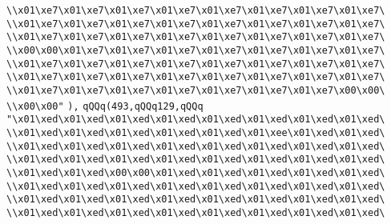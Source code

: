 \verb|\\x01\xe7\x01\xe7\x01\xe7\x01\xe7\x01\xe7\x01\xe7\x01\xe7\x01\xe7\|\newline
\verb|\\x01\xe7\x01\xe7\x01\xe7\x01\xe7\x01\xe7\x01\xe7\x01\xe7\x01\xe7\|\newline
\verb|\\x01\xe7\x01\xe7\x01\xe7\x01\xe7\x01\xe7\x01\xe7\x01\xe7\x01\xe7\|\newline
\verb|\\x00\x00\x01\xe7\x01\xe7\x01\xe7\x01\xe7\x01\xe7\x01\xe7\x01\xe7\|\newline
\verb|\\x01\xe7\x01\xe7\x01\xe7\x01\xe7\x01\xe7\x01\xe7\x01\xe7\x01\xe7\|\newline
\verb|\\x01\xe7\x01\xe7\x01\xe7\x01\xe7\x01\xe7\x01\xe7\x01\xe7\x01\xe7\|\newline
\verb|\\x01\xe7\x01\xe7\x01\xe7\x01\xe7\x01\xe7\x01\xe7\x01\xe7\x00\x00\|\newline
\verb|\\x00\x00"|\newline
\verb|),|\newline
\verb|qQQq(493,qQQq129,qQQq|\newline
\verb|"\x01\xed\x01\xed\x01\xed\x01\xed\x01\xed\x01\xed\x01\xed\x01\xed\|\newline
\verb|\\x01\xed\x01\xed\x01\xed\x01\xed\x01\xed\x01\xee\x01\xed\x01\xed\|\newline
\verb|\\x01\xed\x01\xed\x01\xed\x01\xed\x01\xed\x01\xed\x01\xed\x01\xed\|\newline
\verb|\\x01\xed\x01\xed\x01\xed\x01\xed\x01\xed\x01\xed\x01\xed\x01\xed\|\newline
\verb|\\x01\xed\x01\xed\x00\x00\x01\xed\x01\xed\x01\xed\x01\xed\x01\xed\|\newline
\verb|\\x01\xed\x01\xed\x01\xed\x01\xed\x01\xed\x01\xed\x01\xed\x01\xed\|\newline
\verb|\\x01\xed\x01\xed\x01\xed\x01\xed\x01\xed\x01\xed\x01\xed\x01\xed\|\newline
\verb|\\x01\xed\x01\xed\x01\xed\x01\xed\x01\xed\x01\xed\x01\xed\x01\xed\|\newline
